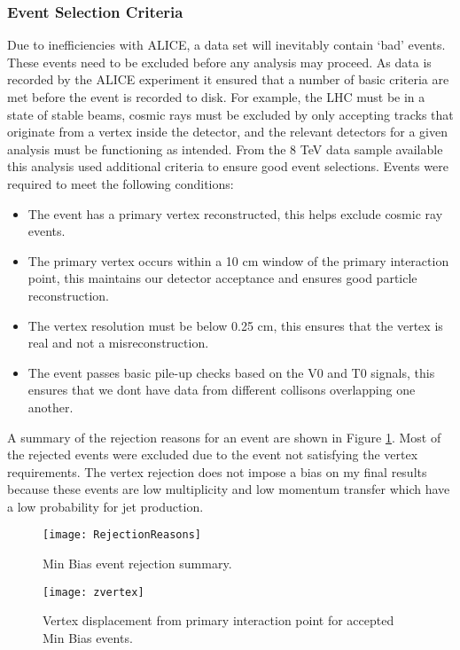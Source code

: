 \subsubsection{Event Selection Criteria}
Due to inefficiencies with ALICE, a data set will inevitably contain `bad' events.  These events need to be excluded before any analysis may proceed.  As data is recorded by the ALICE experiment it ensured that a number of basic criteria are met before the event is recorded to disk.  For example, the LHC must be in a state of stable beams, cosmic rays must be excluded by only accepting tracks that originate from a vertex inside the detector, and the relevant detectors for a given analysis must be functioning as intended.  From the 8 TeV data sample available this analysis used additional criteria to ensure good event selections.  Events were required to meet the following conditions:

\begin{itemize}
  \item The event has a primary vertex reconstructed, this helps exclude cosmic ray events.
  \item The primary vertex occurs within a 10 cm window of the primary interaction point, this maintains our detector acceptance and ensures good particle reconstruction.
  \item The vertex resolution must be below 0.25 cm, this ensures that the vertex is real and not a misreconstruction.
  \item The event passes basic pile-up checks based on the V0 and T0 signals, this ensures that we dont have data from different collisons overlapping one another.
\end{itemize}


A summary of the rejection reasons for an event are shown in Figure \ref{fig:eventqa}.  Most of the rejected events were excluded due to the event not satisfying the vertex requirements.  The vertex rejection does not impose a bias on my final results because these events are low multiplicity and low momentum transfer which have a low probability for jet production.

\begin{figure}[h]
\texttt{[image: RejectionReasons]}
\centering
\caption{Min Bias event rejection summary.}
\label{fig:eventqa}
\end{figure}

\begin{figure}[h]
\texttt{[image: zvertex]}
\centering
\caption{Vertex displacement from primary interaction point for accepted Min Bias events.}
\label{fig:vertrec}
\end{figure}


